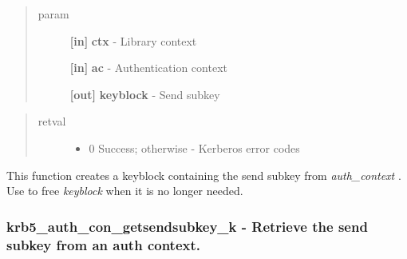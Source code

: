 \documentclass[letterpaper,10pt,english]{sphinxmanual}
\begin{document}
\begin{fulllineitems}
\label{appdev/refs/api/krb5_auth_con_getsendsubkey:c.krb5_auth_con_getsendsubkey}
\end{fulllineitems}

\begin{quote}\begin{description}
\item[{param}] \leavevmode
\textbf{{[}in{]}} \textbf{ctx} - Library context

\textbf{{[}in{]}} \textbf{ac} - Authentication context

\textbf{{[}out{]}} \textbf{keyblock} - Send subkey

\end{description}\end{quote}
\begin{quote}\begin{description}
\item[{retval}] \leavevmode\begin{itemize}
\item {} 
0   Success; otherwise - Kerberos error codes

\end{itemize}

\end{description}\end{quote}

This function creates a keyblock containing the send subkey from \emph{auth\_context} . Use {\hyperref[appdev/refs/api/krb5_free_keyblock:c.krb5_free_keyblock]{}} to free \emph{keyblock} when it is no longer needed.


\subsubsection{krb5\_auth\_con\_getsendsubkey\_k -  Retrieve the send subkey from an auth context.}
\label{appdev/refs/api/krb5_auth_con_getsendsubkey_k:krb5-auth-con-getsendsubkey-k-retrieve-the-send-subkey-from-an-auth-context}\label{appdev/refs/api/krb5_auth_con_getsendsubkey_k::doc}
\end{document}

